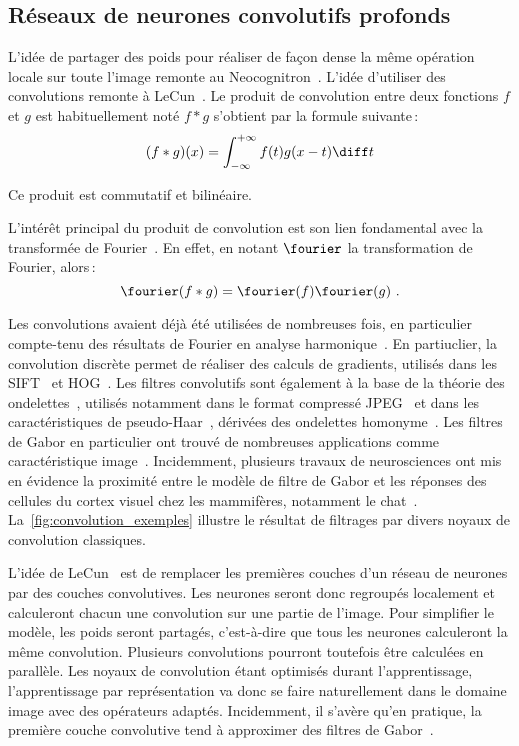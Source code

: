 \subsection{Réseaux de neurones convolutifs profonds}

L'idée de partager des poids pour réaliser de façon dense la même opération locale sur toute l'image remonte au Neocognitron~\cite{fukushima_neocognitron_1980}. L'idée d'utiliser des convolutions remonte à LeCun~\cite{lecun_gradient-based_1998}. Le produit de convolution entre deux fonctions $f$ et $g$ est habituellement noté $f * g$ s'obtient par la formule suivante\,:
$$(f * g)(x) = \int_{-\infty}^{+\infty} f(t)g(x-t)\diff t$$

Ce produit est commutatif et bilinéaire.

L'intérêt principal du produit de convolution est son lien fondamental avec la transformée de Fourier~\cite{fourier_propagation_1822}. En effet, en notant $\fourier$ la transformation de Fourier, alors\,:
$$\fourier(f \ast g) = \fourier (f)\fourier (g)~.$$

Les convolutions avaient déjà été utilisées de nombreuses fois, en particulier compte-tenu des résultats de Fourier en analyse harmonique~\cite{fourier_propagation_1822}. En partiuclier, la convolution discrète permet de réaliser des calculs de gradients, utilisés dans les \gls{SIFT}~\cite{lowe_object_1999} et \gls{HOG}~\cite{dalal_histograms_2005}. Les filtres convolutifs sont également à la base de la théorie des ondelettes~\cite{mallat_exploration_2001}, utilisés notamment dans le format compressé \gls{JPEG}~\cite{daubechies_ten_1992} et dans les caractéristiques de pseudo-Haar~\cite{viola_robust_2001}, dérivées des ondelettes homonyme~\cite{papageorgiou_general_1998}.
Les filtres de Gabor en particulier ont trouvé de nombreuses applications comme caractéristique image~\cite{pati_word_2008}. Incidemment, plusieurs travaux de neurosciences ont mis en évidence la proximité entre le modèle de filtre de Gabor et les réponses des cellules du cortex visuel chez les mammifères, notamment le chat~\cite{marcelja_mathematical_1980,jones_evaluation_1987}. La~\cref{fig:convolution_exemples} illustre le résultat de filtrages par divers noyaux de convolution classiques.

L'idée de LeCun~\cite{lecun_gradient-based_1998} est de remplacer les premières couches d'un réseau de neurones par des couches convolutives. Les neurones seront donc regroupés localement et calculeront chacun une convolution sur une partie de l'image. Pour simplifier le modèle, les poids seront partagés, c'est-à-dire que tous les neurones calculeront la même convolution. Plusieurs convolutions pourront toutefois être calculées en parallèle. Les noyaux de convolution étant optimisés durant l'apprentissage, l'apprentissage par représentation va donc se faire naturellement dans le domaine image avec des opérateurs adaptés. Incidemment, il s'avère qu'en pratique, la première couche convolutive tend à approximer des filtres de Gabor~\cite{yosinski_how_2014}.

